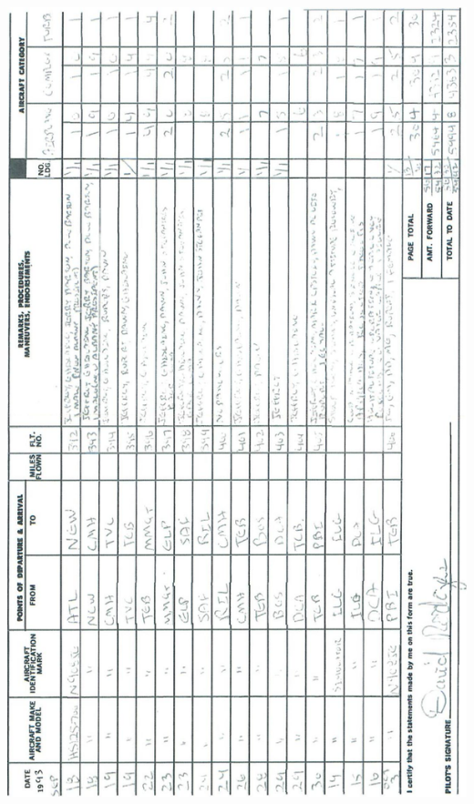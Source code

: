 \documentclass[10pt]{article}
\begin{document}
\includegraphics[max width=\textwidth, center]{2025_02_27_dd68c3d38de88f0516d9g-027}\\
\end{document}
